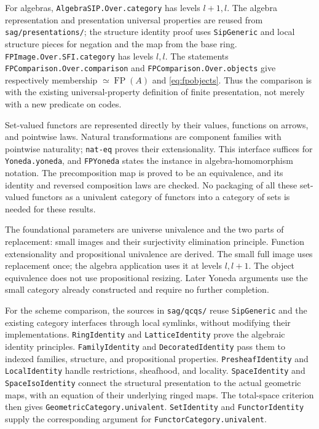 \documentclass[11pt]{amsart}
\theoremstyle{definition}
\theoremstyle{remark}
\newcommand{\FP}{\operatorname{FP}}
\newcommand{\code}[1]{\texttt{\small #1}}
\begin{document}
For algebras, \code{AlgebraSIP.Over.category} has levels $l+1,l$.
The algebra representation and presentation universal properties are
reused from \code{sag/presentations/}; the structure identity proof uses
\code{SipGeneric} and local structure pieces for negation and the map
from the base ring. \code{FPImage.Over.SFI.category} has levels $l,l$.
The statements \code{FPComparison.Over.comparison} and
\code{FPComparison.Over.objects} give respectively membership
$\simeq\FP(A)$ and \eqref{eq:fpobjects}. Thus the comparison is with the
existing universal-property definition of finite presentation, not merely
with a new predicate on codes.

Set-valued functors are represented directly by their values, functions
on arrows, and pointwise laws. Natural transformations are component
families with pointwise naturality; \code{nat-eq} proves their
extensionality. This interface suffices for \code{Yoneda.yoneda}, and
\code{FPYoneda} states the instance in algebra-homomorphism notation.
The precomposition map is proved to be an equivalence, and its identity
and reversed composition laws are checked. No packaging of all these
set-valued functors as a univalent category of functors into a category
of sets is needed for these results.

The foundational parameters are universe univalence and the two parts
of replacement: small images and their surjectivity elimination
principle. Function extensionality and propositional univalence are
derived. The small full image uses replacement once; the algebra
application uses it at levels $l,l+1$. The object equivalence does not
use propositional resizing. Later Yoneda arguments use the small category
already constructed and require no further completion.

\begingroup\raggedright
For the scheme comparison, the sources in \code{sag/qcqs/} reuse
\code{SipGeneric} and the existing category interfaces through local
symlinks, without modifying their implementations.
\code{RingIdentity} and \code{LatticeIdentity} prove the algebraic
identity principles. \code{FamilyIdentity} and \code{DecoratedIdentity}
pass them to indexed families, structure, and propositional properties.
\code{PresheafIdentity} and \code{LocalIdentity} handle restrictions,
sheafhood, and locality. \code{SpaceIdentity} and
\code{SpaceIsoIdentity} connect the structural presentation to the
actual geometric maps, with an equation of their underlying ringed maps.
The total-space criterion then gives \code{GeometricCategory.univalent}.
\code{SetIdentity} and \code{FunctorIdentity} supply the corresponding
argument for \code{FunctorCategory.univalent}.
\end{document}
